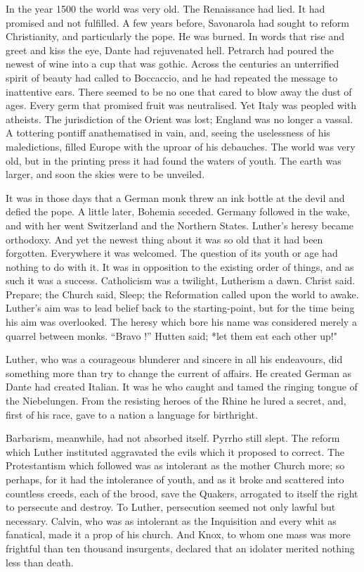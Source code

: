 \documentclass[]{book}
\begin{document}
In the year 1500 the world was very old. The Renaissance had lied. It
had promised and not fulfilled. A few years before, Savonarola had
sought to reform Christianity, and particularly the pope. He was burned.
In words that rise and greet and kiss the eye, Dante had rejuvenated
hell. Petrarch had poured the newest of wine into a cup that was gothic.
Across the centuries an unterrified spirit of beauty had called to
Boccaccio, and he had repeated the message to inattentive ears. There
seemed to be no one that cared to blow away the dust of ages. Every germ
that promised fruit was neutralised. Yet Italy was peopled with
atheists. The jurisdiction of the Orient was lost; England was no longer
a vassal. A tottering pontiff anathematised in vain, and, seeing the
uselessness of his maledictions, filled Europe with the uproar of his
debauches. The world was very old, but in the printing press it had
found the waters of youth. The earth was larger, and soon the skies were
to be unveiled.

It was in those days that a German monk threw an ink bottle at the devil
and defied the pope. A little later, Bohemia seceded. Germany followed
in the wake, and with her went Switzerland and the Northern States.
Luther's heresy became orthodoxy. And yet the newest thing about it was
so old that it had been forgotten. Everywhere it was welcomed. The
question of its youth or age had nothing to do with it. It was in
opposition to the existing order of things, and as such it was a
success. Catholicism was a twilight, Lutherism a dawn. Christ said.
Prepare; the Church said, Sleep; the Reformation called upon the world
to awake. Luther's aim was to lead belief back to the starting-point,
but for the time being his aim was overlooked. The heresy which bore his
name was considered merely a quarrel between monks. ``Bravo !'' Hutten
said; *let them eat each other up!"

Luther, who was a courageous blunderer and sincere in all his
endeavours, did something more than try to change the current of
affairs. He created German as Dante had created Italian. It was he who
caught and tamed the ringing tongue of the Niebelungen. From the
resisting heroes of the Rhine he lured a secret, and, first of his race,
gave to a nation a language for birthright.

Barbarism, meanwhile, had not absorbed itself. Pyrrho still slept. The
reform which Luther instituted aggravated the evils which it proposed to
correct. The Protestantism which followed was as intolerant as the
mother Church more; so perhaps, for it had the intolerance of youth, and
as it broke and scattered into countless creeds, each of the brood, save
the Quakers, arrogated to itself the right to persecute and destroy. To
Luther, persecution seemed not only lawful but necessary. Calvin, who
was as intolerant as the Inquisition and every whit as fanatical, made
it a prop of his church. And Knox, to whom one mass was more frightful
than ten thousand insurgents, declared that an idolater merited nothing
less than death.
\end{document}
